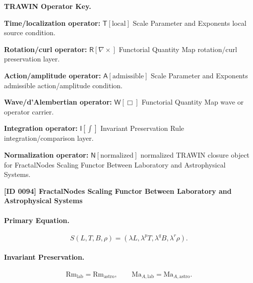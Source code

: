 \par\vspace{0.45\baselineskip}
\noindent\begin{minipage}[t]{\linewidth}
\begingroup
\small
\raggedright
\textbf{TRAWIN Operator Key.}\par
\noindent\textbf{Time/localization operator:} $\mathsf{T}\!\left[\mathrm{local}\right]$ Scale Parameter and Exponents local source condition.\par
\noindent\textbf{Rotation/curl operator:} $\mathsf{R}\!\left[\nabla\times\right]$ Functorial Quantity Map rotation/curl preservation layer.\par
\noindent\textbf{Action/amplitude operator:} $\mathsf{A}\!\left[\mathrm{admissible}\right]$ Scale Parameter and Exponents admissible action/amplitude condition.\par
\noindent\textbf{Wave/d'Alembertian operator:} $\mathsf{W}\!\left[\Box\right]$ Functorial Quantity Map wave or operator carrier.\par
\noindent\textbf{Integration operator:} $\mathsf{I}\!\left[\int\right]$ Invariant Preservation Rule integration/comparison layer.\par
\noindent\textbf{Normalization operator:} $\mathsf{N}\!\left[\mathrm{normalized}\right]$ normalized TRAWIN closure object for FractalNodes Scaling Functor Between Laboratory and Astrophysical Systems.\par
\endgroup
\end{minipage}

\clearpage
\noindent\textbf{[ID 0094] FractalNodes Scaling Functor Between Laboratory and Astrophysical Systems}\par
\vspace{0.35em}
\paragraph{Primary Equation.}
\begin{equation}
S(L,T,B,\rho)
=
(\lambda L,\lambda^{p}T,\lambda^{q}B,\lambda^{r}\rho).
\end{equation}

\paragraph{Invariant Preservation.}
\begin{equation}
\mathrm{Rm}_{\mathrm{lab}}=\mathrm{Rm}_{\mathrm{astro}},
\qquad
\mathrm{Ma}_{A,\mathrm{lab}}=\mathrm{Ma}_{A,\mathrm{astro}}.
\end{equation}

